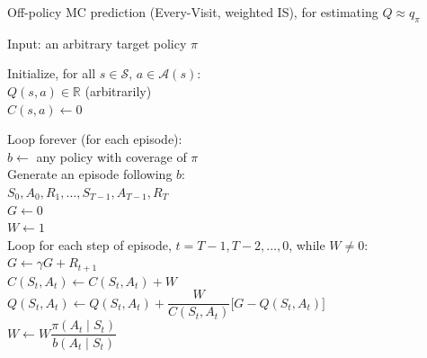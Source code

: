 \begin{algobox}{Off-policy MC prediction (Every-Visit, weighted IS), for estimating $Q \approx q_\pi$}
\raggedright
Input: an arbitrary target policy $\pi$

\medskip
Initialize, for all $s \in \mathcal{S},\, a \in \mathcal{A}(s)$:\\
\hspace*{1.5em}$Q(s,a) \in \mathbb{R}$ (arbitrarily)\\
\hspace*{1.5em}$C(s,a) \leftarrow 0$

\medskip
Loop forever (for each episode):\\
\hspace*{1.5em}$b \leftarrow$ any policy with coverage of $\pi$\\
\hspace*{1.5em}Generate an episode following $b$:\\
\hspace*{3em}$S_0, A_0, R_1, \dots, S_{T-1}, A_{T-1}, R_T$\\
\hspace*{1.5em}$G \leftarrow 0$\\
\hspace*{1.5em}$W \leftarrow 1$\\
\hspace*{1.5em}Loop for each step of episode, $t = T-1, T-2, \dots, 0$, while $W \neq 0$:\\
\hspace*{3em}$G \leftarrow \gamma G + R_{t+1}$\\
\hspace*{3em}$C(S_t,A_t) \leftarrow C(S_t,A_t) + W$\\
\hspace*{3em}$Q(S_t,A_t) \leftarrow Q(S_t,A_t) +
\dfrac{W}{C(S_t,A_t)}
\bigl[G-Q(S_t,A_t)\bigr]$\\
\hspace*{3em}$W \leftarrow W \dfrac{\pi(A_t \mid S_t)}{b(A_t \mid S_t)}$
\end{algobox}


